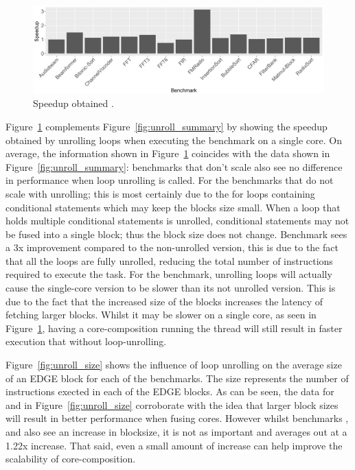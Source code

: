 \begin{figure}[t]
  \includegraphics[width=1\textwidth]{streamit-paper/graphics/unroll_speed_bars.pdf}
  \caption{Speedup obtained .}\label{fig:unroll_bars}
\end{figure}
Figure~\ref{fig:unroll_bars} complements Figure~\ref{fig:unroll_summary} by showing the speedup obtained by unrolling loops when executing the benchmark on a single core.
On average, the information shown in Figure~\ref{fig:unroll_bars} coincides with the data shown in Figure~\ref{fig:unroll_summary}: benchmarks that don't scale also see no difference in performance when loop unrolling is called.
For the benchmarks that do not scale with unrolling; this is most certainly due to the for loops containing conditional statements which may keep the blocks size small.
When a loop that holds multiple conditional statements is unrolled, conditional statements may not be fused into a single block; thus the block size does not change.
Benchmark  sees a 3x improvement compared to the non-unrolled version, this is due to the fact that all the loops are fully unrolled, reducing the total number of instructions required to execute the task.
For the  benchmark, unrolling loops will actually cause the single-core version to be slower than its not unrolled version.
This is due to the fact that the increased size of the blocks increases the latency of fetching larger blocks.
Whilst it may be slower on a single core, as seen in Figure~\ref{fig:unroll_bars}, having a core-composition running the thread will still result in faster execution that without loop-unrolling.

Figure~\ref{fig:unroll_size} shows the influence of loop unrolling on the average size of an EDGE block for each of the benchmarks.
The size represents the number of instructions exected in each of the EDGE blocks.
As can be seen, the data for  and  in Figure~\ref{fig:unroll_size} corroborate with the idea that larger block sizes will result in better performance when fusing cores.
However whilst benchmarks ,  and  also see an increase in blocksize, it is not as important and averages out at a 1.22x increase.
That said, even a small amount of increase can help improve the scalability of core-composition.

